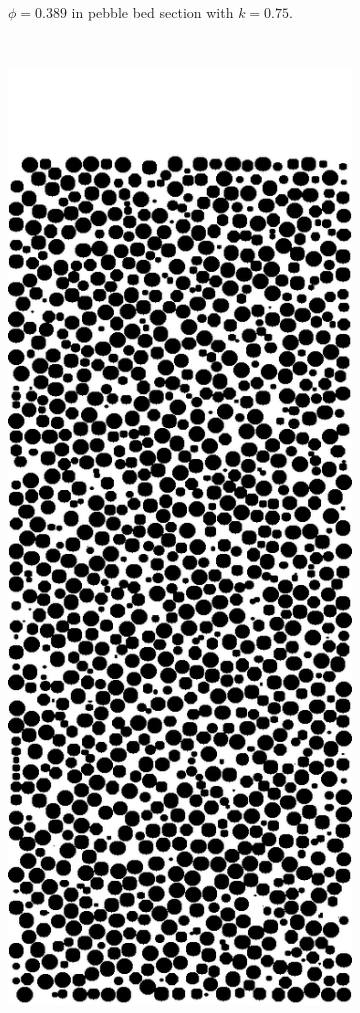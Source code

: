 \begin{figure}[ht]
\begin{subfigure}[b]{0.2\textwidth}
                \caption{$\phi = 0.389$ in pebble bed section with $k = 0.75$.}
                \label{fig:2d-res20-k075}
        \end{subfigure}%
        ~
        \begin{subfigure}[b]{0.2\textwidth}
                \includegraphics[width=\textwidth]{figures/lbm/2d-res20-k090.png}

\end{subfigure}
\end{figure}
